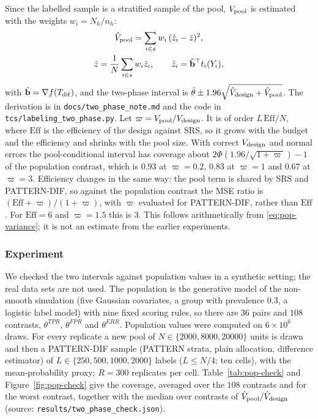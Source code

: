 Since the labelled sample is a stratified sample of the pool, $V_{\rm pool}$ is estimated with the weights $w_i=N_h/n_h$:
\[
\begin{gathered}
\hat V_{\rm pool}=\sum_{i\in s}w_i\,(\hat z_i-\bar z)^2,\\
\bar z=\frac1N\sum_{i\in s}w_i\hat z_i,\qquad \hat z_i=\hat{\mathbf b}^{\top}t_i(Y_i),
\end{gathered}
\]
with $\hat{\mathbf b}=\nabla f(T_{\rm dif})$, and the two-phase interval is $\hat\theta\pm1.96\sqrt{\hat V_{\rm design}+\hat V_{\rm pool}}$. The derivation is in \texttt{docs/two\_phase\_note.md} and the code in \texttt{tcs/labeling\_two\_phase.py}. Let $\varpi=V_{\rm pool}/V_{\rm design}$. It is of order $L\,\mathrm{Eff}/N$, where $\mathrm{Eff}$ is the efficiency of the design against SRS, so it grows with the budget and the efficiency and shrinks with the pool size. With correct $V_{\rm design}$ and normal errors the pool-conditional interval has coverage about $2\Phi(1.96/\sqrt{1+\varpi})-1$ of the population contrast, which is $0.93$ at $\varpi=0.2$, $0.83$ at $\varpi=1$ and $0.67$ at $\varpi=3$. Efficiency changes in the same way: the pool term is shared by SRS and PATTERN-DIF, so against the population contrast the MSE ratio is $(\mathrm{Eff}+\varpi)/(1+\varpi)$, with $\varpi$ evaluated for PATTERN-DIF, rather than $\mathrm{Eff}$. For $\mathrm{Eff}=6$ and $\varpi=1.5$ this is $3$. This follows arithmetically from \eqref{eq:pop-variance}; it is not an estimate from the earlier experiments.

\subsubsection*{Experiment}
We checked the two intervals against population values in a synthetic setting; the real data sets are not used. The population is the generative model of the non-smooth simulation (five Gaussian covariates, a group with prevalence $0.3$, a logistic label model) with nine fixed scoring rules, so there are $36$ pairs and $108$ contrasts, $\theta^{TPR}$, $\theta^{FPR}$ and $\theta^{ERR}$. Population values were computed on $6\times10^{6}$ draws. For every replicate a new pool of $N\in\{2000,8000,20000\}$ units is drawn and then a PATTERN-DIF sample (PATTERN strata, plain allocation, difference estimator) of $L\in\{250,500,1000,2000\}$ labels ($L\le N/4$; ten cells), with the mean-probability proxy; $R=300$ replicates per cell. Table~\ref{tab:pop-check} and Figure~\ref{fig:pop-check} give the coverage, averaged over the $108$ contrasts and for the worst contrast, together with the median over contrasts of $\hat V_{\rm pool}/\hat V_{\rm design}$ (source: \texttt{results/two\_phase\_check.json}).

